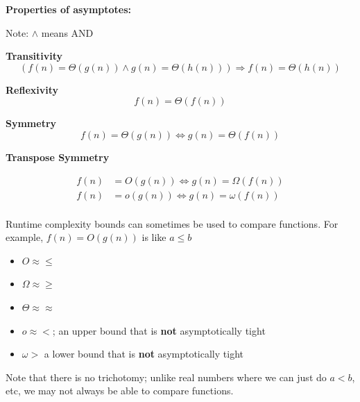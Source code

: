 \documentclass[10pt]{article}
\begin{document}
\begin{theorem}
	\textbf{Properties of asymptotes:} 

	Note: $\land $ means AND

	\textbf{Transitivity} 
	\begin{equation}
		(f(n) = \Theta(g(n)) \land g(n) = \Theta(h(n))) \Rightarrow f(n) = \Theta(h(n))
		\label{eq:358:asymptotic_transitivity}
	\end{equation} 


	\textbf{Reflexivity}
	\begin{equation}
		f(n) = \Theta(f(n))
		\label{eq:358:asymptotic_reflexivity}
	\end{equation}
	
	\textbf{Symmetry}
	\begin{equation}
		f(n) = \Theta(g(n)) \iff g(n) = \Theta(f(n))
		\label{eq:358:asymptotic_symmetry}
	\end{equation}
	

	\textbf{Transpose Symmetry}

	\begin{equation}
		\begin{split}
			 f(n) &= O(g(n)) \iff g(n) = \Omega(f(n))  \\
			 f(n) &= o(g(n)) \iff g(n) = \omega(f(n))  \\
		\end{split}
		\label{eq:358:asymptotic_transpose_symmetry}
	\end{equation}

\end{theorem}


Runtime complexity bounds can sometimes be used to compare functions. For example, $ f(n) = O(g(n)) $ is like $ a \le b $

\begin{itemize}
	\item $ O \approx \le $
	\item $ \Omega \approx \ge  $ 
	\item $ \Theta \approx \approx  $ 
	\item $ o \approx < $; an upper bound that is \textbf{not}  asymptotically tight
	\item $ \omega > $ a lower bound that is \textbf{not}  asymptotically tight
\end{itemize}

Note that there is no trichotomy; unlike real numbers where we can just do $ a<b $, etc, we may not always be able to compare functions.
\end{document}
